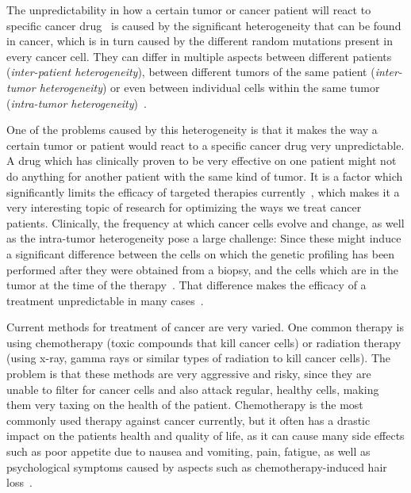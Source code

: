The unpredictability in how a certain tumor or cancer patient will react to specific cancer drug~\cite{heterogeneity-implications-targeted-therapeutics} is caused by the significant heterogeneity that can be found in cancer, which is in turn caused by the different random mutations present in every cancer cell. They can differ in multiple aspects between different patients (\textit{inter-patient heterogeneity}), between different tumors of the same patient (\textit{inter-tumor heterogeneity}) or even between individual cells within the same tumor (\textit{intra-tumor heterogeneity})~\cite{heterogeneity-implications-targeted-therapeutics}.

One of the problems caused by this heterogeneity is that it makes the way a certain tumor or patient would react to a specific cancer drug very unpredictable. A drug which has clinically proven to be very effective on one patient might not do anything for another patient with the same kind of tumor. It is a factor which significantly limits the efficacy of targeted therapies currently~\cite{heterogeneity-is-it-a-problem}, which makes it a very interesting topic of research for optimizing the ways we treat cancer patients. Clinically, the frequency at which cancer cells evolve and change, as well as the intra-tumor heterogeneity pose a large challenge: Since these might induce a significant difference between the cells on which the genetic profiling has been performed after they were obtained from a biopsy, and the cells which are in the tumor at the time of the therapy~\cite{heterogeneity-is-it-a-problem}. That difference makes the efficacy of a treatment unpredictable in many cases~\cite{narrative-review-heterogeneity-challenges}.

Current methods for treatment of cancer are very varied. One common therapy is using chemotherapy (toxic compounds that kill cancer cells) or radiation therapy (using x-ray, gamma rays or similar types of radiation to kill cancer cells). The problem is that these methods are very aggressive and risky, since they are unable to filter for cancer cells and also attack regular, healthy cells, making them very taxing on the health of the patient. Chemotherapy is the most commonly used therapy against cancer currently, but it often has a drastic impact on the patients health and quality of life, as it can cause many side effects such as poor appetite due to nausea and vomiting, pain, fatigue, as well as psychological symptoms caused by aspects such as chemotherapy-induced hair loss~\cite{cancer-chemotherapy-and-beyond}.

